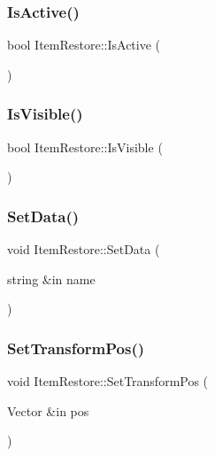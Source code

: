\subsubsection{\texorpdfstring{Is\+Active()}{IsActive()}}
{\footnotesize\ttfamily bool Item\+Restore\+::\+Is\+Active (\begin{DoxyParamCaption}{ }\end{DoxyParamCaption})}

\hypertarget{class_item_restore_a101320992983faad9c2661738e11ffd8}{}\label{class_item_restore_a101320992983faad9c2661738e11ffd8} 
\subsubsection{\texorpdfstring{Is\+Visible()}{IsVisible()}}
{\footnotesize\ttfamily bool Item\+Restore\+::\+Is\+Visible (\begin{DoxyParamCaption}{ }\end{DoxyParamCaption})}

\hypertarget{class_item_restore_a467e238a37299c89726bfb3f6520952b}{}\label{class_item_restore_a467e238a37299c89726bfb3f6520952b} 
\subsubsection{\texorpdfstring{Set\+Data()}{SetData()}}
{\footnotesize\ttfamily void Item\+Restore\+::\+Set\+Data (\begin{DoxyParamCaption}\item[{string \&in}]{name }\end{DoxyParamCaption})}

\hypertarget{class_item_restore_a03255a66844289e3d8d94d69ffb56c23}{}\label{class_item_restore_a03255a66844289e3d8d94d69ffb56c23} 
\subsubsection{\texorpdfstring{Set\+Transform\+Pos()}{SetTransformPos()}}
{\footnotesize\ttfamily void Item\+Restore\+::\+Set\+Transform\+Pos (\begin{DoxyParamCaption}\item[{Vector \&in}]{pos }\end{DoxyParamCaption})}

